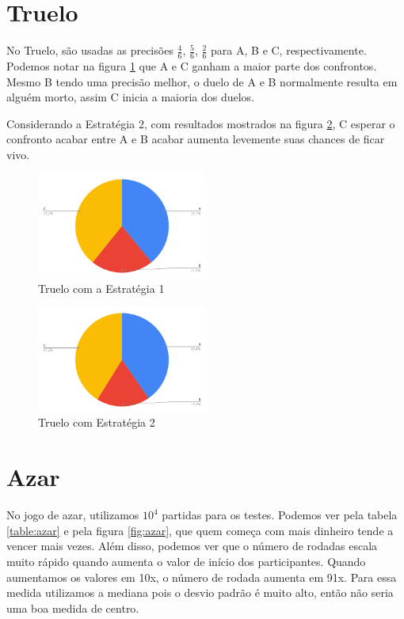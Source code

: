 \documentclass{report}
\begin{document}
\section{Truelo}

No Truelo, são usadas as precisões $\frac{4}{6}$, $\frac{5}{6}$, $\frac{2}{6}$ para A, B e C, respectivamente.
Podemos notar na figura \ref*{fig:t1} que A e C ganham a maior parte dos confrontos.
Mesmo B tendo uma precisão melhor, o duelo de A e B normalmente resulta em alguém morto,
assim C inicia a maioria dos duelos.

Considerando a Estratégia 2, com resultados mostrados na figura \ref{fig:t2}, C esperar
o confronto acabar entre A e B acabar aumenta levemente suas chances de ficar vivo.

\begin{figure}[h]
    \caption{Truelo com a Estratégia 1}
    \label{fig:t1}
    \centering
    \includegraphics[width=0.5\textwidth]{truelo-um.png}
    \end{figure}
\begin{figure}[h]
    \caption{Truelo com Estratégia 2}
    \label{fig:t2}
    \centering
    \includegraphics[width=0.5\textwidth]{truelo-dois.png}
    \end{figure}
\newpage

\section{Azar}

No jogo de azar, utilizamos $10^4$ partidas para os testes. Podemos ver pela tabela
\ref{table:azar} e pela figura \ref{fig:azar}, que quem começa com mais dinheiro tende a vencer mais vezes.
Além disso, podemos ver que o número de rodadas escala muito rápido quando aumenta
o valor de início dos participantes. Quando aumentamos os valores em 10x, o número
de rodada aumenta em 91x. Para essa medida utilizamos a mediana pois o desvio padrão
é muito alto, então não seria uma boa medida de centro.
\end{document}
